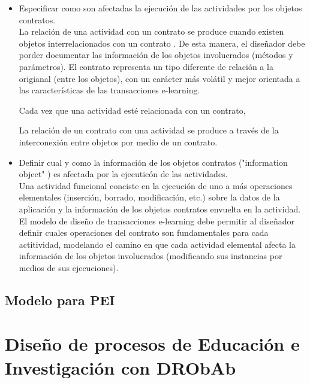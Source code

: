 \documentclass{llncs}
\begin{document}
\begin{itemize}

\item Especificar como son afectadas la ejecución de las actividades por los objetos contratos. 
\\

La relación de una actividad con un contrato se produce cuando existen objetos interrelacionados con un contrato \cite{interconecting}. De esta manera, el diseñador debe porder documentar las información de los objetos involucrados (métodos y parámetros). El contrato representa un tipo diferente de relación a la origianal (entre los objetos), con un carácter más volátil y mejor orientada a las características de las transacciones e-learning.



Cada vez que una actividad esté relacionada con un contrato, 


La relación de un contrato con una actividad se produce a través de la interconexión entre objetos por medio de un contrato.





\item  Definir cual y como la  información de los objetos contratos ("information object" \cite{information_object}) es afectada por la ejecuticón de las actividades.
\\

Una actividad funcional conciste en la ejecución de uno a más operaciones elementales (inserción, borrado, modificación, etc.) sobre la datos de la aplicación y la información de los objetos contratos envuelta en la actividad. El modelo de diseño de transacciones e-learning debe permitir al diseñador definir cuales operaciones del contrato son fundamentales para cada actitividad, modelando el camino en que cada actividad elemental afecta la información de los objetos involucrados (modificando sus instancias por medios de sus ejecuciones).


\end{itemize}


\subsection {Modelo para PEI}


\section {Diseño de procesos de Educación e Investigación con DRObAb}
\end{document}
